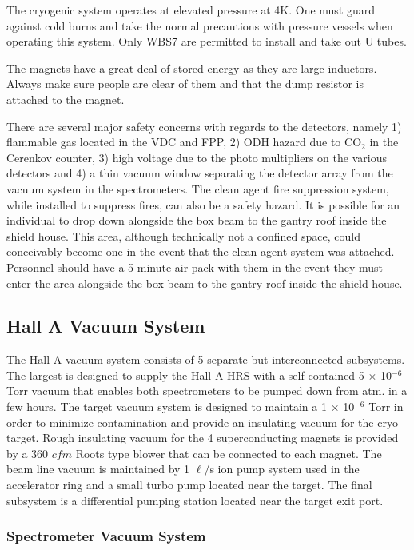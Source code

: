 The cryogenic system operates at elevated pressure at 4K.  One must 
guard against cold burns and take the normal precautions with pressure 
vessels when operating this system.  Only WBS7 are permitted to install 
and take out U tubes.

The magnets have a great deal of stored energy as they are large 
inductors. Always make sure people are clear of them and that
the dump resistor is attached to the magnet.

There are several major safety concerns with regards to the detectors, 
namely 1) flammable gas located in the VDC and FPP, 2) ODH hazard due to 
CO$_2$ in the Cerenkov counter, 3) high voltage due to the photo 
multipliers on the various detectors and 4) a thin vacuum window 
separating the detector array from the vacuum system in the 
spectrometers.  The clean agent fire suppression system, while installed 
to suppress fires, can also be a safety hazard.  It is possible for an 
individual to drop down alongside the box beam to the gantry roof 
inside the shield house.  This area, although technically not a confined 
space, could conceivably become one in the event that the clean agent 
system was attached.  Personnel should have a 5 minute air pack with 
them in the event they must enter the area alongside the box beam to the gantry roof 
inside the shield house.

\subsection{Hall A Vacuum System}

The Hall A vacuum system consists of 5 separate but interconnected 
subsystems.  The largest is designed to supply the Hall A HRS with a 
self contained 5 $\times$ 10$^{-6}$ Torr vacuum that enables both 
spectrometers to be pumped down from atm. in a few hours.  The target 
vacuum system is designed to maintain a 1 $\times$ 10$^{-6}$ Torr in 
order to minimize contamination and provide an insulating vacuum for the 
cryo target.  Rough insulating vacuum for the 4 superconducting magnets 
is provided by a 360 $cfm$ Roots type blower that can be connected to each 
magnet.  The beam line vacuum is maintained by 1 $\ell$/s ion pump 
system used in the accelerator ring and a small turbo pump located near 
the target.  The final subsystem is a differential pumping station 
located near the target exit port.

\subsubsection{Spectrometer Vacuum System}


